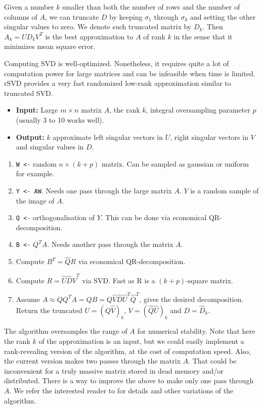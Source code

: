 \documentclass[a4paper,11pt]{amsart}
\begin{document}
Given a number $k$ smaller than both the number of rows and the number of columns of $A$, we can truncate $D$ by keeping $\sigma_1$ through $\sigma_k$ and setting the other singular values to zero. We denote such truncated matrix by $D_k$. Then $A_k = UD_kV^T$ is the best approximation to $A$ of rank $k$ in the sense that it minimizes mean square error. 

Computing SVD is well-optimized. Nonetheless, it requires quite a lot of computation power for large matrices and can be infeasible when time is limited. rSVD provides a very fast randomized low-rank approximation similar to truncated SVD.
\begin{itemize}
  \item \textbf{Input:} Large $m\times n$ matrix $A$, the rank $k$, integral oversampling parameter $p$ (usually 3 to 10 works well).
  \item \textbf{Output:} $k$ approximate left singular vectors in $U$, right singular vectors in $V$ and singular values in $D$.
\end{itemize}
\begin{enumerate}
  \item \verb|W <-| random $n\times (k+p)$ matrix. Can be sampled as gaussian or uniform for example.
  \item \verb|Y <- AW|. Needs one pass through the large matrix $A$. $Y$ is a random sample of the image of $A$.
  \item \verb|Q <-| orthogonalisation of $Y$. This can be done via economical QR-decomposition.
  \item \verb|B <-| $Q^TA$. Needs another pass through the matrix $A$.
  \item Compute $B^T = \hat{Q}R$ via economical QR-decomposition.
  \item Compute $R = \hat{U}\hat{D}\hat{V}^T$ via SVD. Fast as R is a $(k+p)$-square matrix.
  \item Assume $A\approx QQ^TA = QB = Q\hat{V}\hat{D}\hat{U}^T\hat{Q}^T$, gives the desired decomposition.
    \\ Return the truncated $U=(Q\hat{V})_k$, $V=(\hat{Q}\hat{U})_k$ and $D = \hat{D}_k$.
\end{enumerate}
The algorithm oversamples the range of $A$ for numerical stability. Note that here the rank $k$ of the approximation is an input, but we could easily implement a rank-revealing version of the algorithm, at the cost of computation speed. Also, the current version makes two passes through the matrix $A$. That could be inconvenient for a truly massive matrix stored in dead memory and/or distributed. There is a way to improve the above to make only one pass through $A$. We refer the interested reader to \cite{MV} for details and other variations of the algorithm. 
\end{document}
